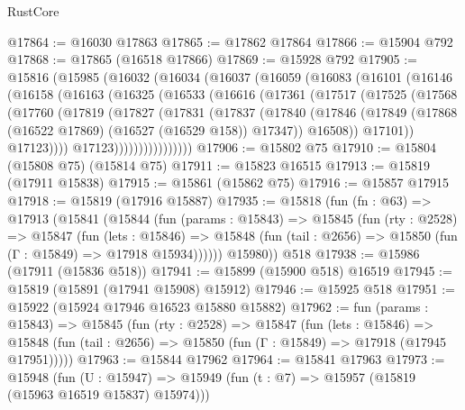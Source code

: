 \begin{lexlean}{RustCore}
\begin{coremodule}
@17864 := @16030 @17863
@17865 := @17862 @17864
@17866 := @15904 @792
@17868 := @17865 (@16518 @17866)
@17869 := @15928 @792
@17905 := @15816
    (@15985
      (@16032
        (@16034
          (@16037
            (@16059
              (@16083
                (@16101
                  (@16146
                    (@16158
                      (@16163
                        (@16325
                          (@16533
                            (@16616
                              (@17361
                                (@17517
                                  (@17525
                                    (@17568
                                      (@17760
                                        (@17819
                                          (@17827
                                            (@17831
                                              (@17837
                                                (@17840
                                                  (@17846
                                                    (@17849
                                                      (@17868
                                                        (@16522 @17869)
                                                        (@16527 (@16529 @158))
                                                        @17347))
                                                    @16508))
                                                @17101))
                                            @17123))))
                                    @17123))))))))))))))))
@17906 := @15802 @75
@17910 := @15804 (@15808 @75) (@15814 @75)
@17911 := @15823 @16515
@17913 := @15819 (@17911 @15838)
@17915 := @15861 (@15862 @75)
@17916 := @15857 @17915
@17918 := @15819 (@17916 @15887)
@17935 := @15818
    (fun (fn : @63) =>
    @17913
      (@15841
        (@15844
          (fun (params : @15843) =>
          @15845
            (fun (rty : @2528) =>
            @15847
              (fun (lets : @15846) =>
              @15848 (fun (tail : @2656) => @15850 (fun (Γ : @15849) => @17918 @15934))))))
        @15980))
    @518
@17938 := @15986 (@17911 (@15836 @518))
@17941 := @15899 (@15900 @518) @16519
@17945 := @15819 (@15891 (@17941 @15908) @15912)
@17946 := @15925 @518
@17951 := @15922 (@15924 @17946 @16523 @15880 @15882)
@17962 := fun (params : @15843) =>
  @15845
    (fun (rty : @2528) =>
    @15847
      (fun (lets : @15846) =>
      @15848 (fun (tail : @2656) => @15850 (fun (Γ : @15849) => @17918 (@17945 @17951)))))
@17963 := @15844 @17962
@17964 := @15841 @17963
@17973 := @15948
    (fun (U : @15947) => @15949 (fun (t : @7) => @15957 (@15819 (@15963 @16519 @15837) @15974)))

\end{coremodule}
\end{lexlean}
